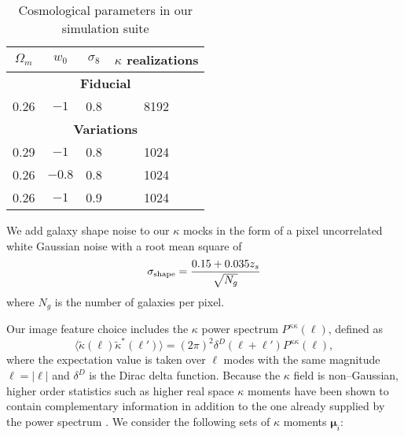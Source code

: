 \documentclass[reprint,aps,prd,superscriptaddress,showkeys,showpacs]{revtex4-1}
\begin{document}
\begin{table}
\begin{center}

\begin{tabular}{c|c|c|c}

$\Omega_m$ & $w_0$ & $\sigma_8$ & $\kappa$ realizations \\ \hline \hline
\multicolumn{4}{c}{\textbf{Fiducial}} \\ \hline
0.26 & $-1$ & 0.8 & 8192 \\ \hline

\multicolumn{4}{c}{\textbf{Variations}} \\ \hline
0.29 & $-1$ & 0.8 & 1024 \\
0.26 & $-0.8$ & 0.8 & 1024 \\
0.26 & $-1$ & 0.9 & 1024 \\ \hline

\end{tabular}

\end{center}

\caption{Cosmological parameters in our simulation suite}
\label{tab:cosmopar}

\end{table}

We add galaxy shape noise to our $\kappa$ mocks in the form of a pixel uncorrelated white Gaussian noise \citep{SongKnox} with a root mean square of
\begin{equation}
\label{par:shaperms}
\sigma_{\rm shape} = \frac{0.15+0.035z_s}{\sqrt{N_g}}
\end{equation}
%
where $N_g$ is the number of galaxies per pixel. 

Our image feature choice includes the $\kappa$ power spectrum $P^{\kappa\kappa}(\ell)$, defined as 
\begin{equation}
\label{par:powerdef}
\langle\tilde{\kappa}(\pmb{\ell})\tilde{\kappa}^*(\pmb{\ell}')\rangle = (2\pi)^2\delta^D(\pmb{\ell}+\pmb{\ell}')P^{\kappa\kappa}(\ell),
\end{equation}
%
where the expectation value is taken over $\pmb{\ell}$ modes with the same magnitude $\ell=\vert\pmb{\ell}\vert$ and $\delta^D$ is the Dirac delta function. Because the $\kappa$ field is non--Gaussian, higher order statistics such as higher real space $\kappa$ moments have been shown to contain complementary information in addition to the one already supplied by the power spectrum \citep{MinkPetri,CFHTMink,NG-Jain1,NG-Jain2}. We consider the following sets of $\kappa$ moments $\pmb{\mu}_i$:
\end{document}
